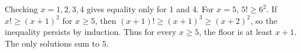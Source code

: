 Checking $x=1,2,3,4$ gives equality only for 1 and 4. For $x=5$, $5!\ge6^2$. If $x!\ge(x+1)^2$ for $x\ge5$, then $(x+1)!\ge(x+1)^3\ge(x+2)^2$, so the inequality persists by induction. Thus for every $x\ge5$, the floor is at least $x+1$. The only solutions sum to $\boxed5$.

